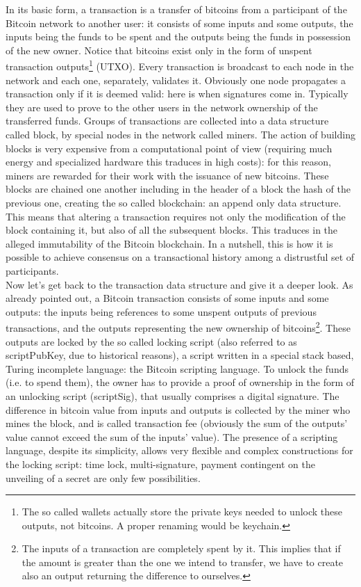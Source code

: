 \bigskip
\noindent
In its basic form, a transaction is a transfer of bitcoins from a participant of the Bitcoin network to another user: it consists of some inputs and some outputs, the inputs being the funds to be spent and the outputs being the funds in possession of the new owner. Notice that bitcoins exist only in the form of unspent transaction outputs\footnote{The so called wallets actually store the private keys needed to unlock these outputs, not bitcoins. A proper renaming would be keychain.} (UTXO). Every transaction is broadcast to each node in the network and each one, separately, validates it. Obviously one node propagates a transaction only if it is deemed valid: here is when signatures come in. Typically they are used to prove to the other users in the network ownership of the transferred funds. Groups of transactions are collected into a data structure called block, by special nodes in the network called miners. The action of building blocks is very expensive from a computational point of view (requiring much energy and specialized hardware this traduces in high costs): for this reason, miners are rewarded for their work with the issuance of new bitcoins. These blocks are chained one another including in the header of a block the hash of the previous one, creating the so called blockchain: an append only data structure. This means that altering a transaction requires not only the modification of the block containing it, but also of all the subsequent blocks. This traduces in the alleged immutability of the Bitcoin blockchain. In a nutshell, this is how it is possible to achieve consensus on a transactional history among a distrustful set of participants.
\\
Now let's get back to the transaction data structure and give it a deeper look. As already pointed out, a Bitcoin transaction consists of some inputs and some outputs: the inputs being references to some unspent outputs of previous transactions, and the outputs representing the new ownership of bitcoins\footnote{The inputs of a transaction are completely spent by it. This implies that if the amount is greater than the one we intend to transfer, we have to create also an output returning the difference to ourselves.}. These outputs are locked by the so called locking script (also referred to as scriptPubKey, due to historical reasons), a script written in a special stack based, Turing incomplete language: the Bitcoin scripting language. To unlock the funds (i.e. to spend them), the owner has to provide a proof of ownership in the form of an unlocking script (scriptSig), that usually comprises a digital signature. The difference in bitcoin value from inputs and outputs is collected by the miner who mines the block, and is called transaction fee (obviously the sum of the outputs' value cannot exceed the sum of the inputs' value). The presence of a scripting language, despite its simplicity, allows very flexible and complex constructions for the locking script: time lock, multi-signature, payment contingent on the unveiling of a secret are only few possibilities.

